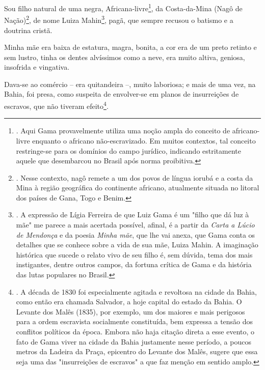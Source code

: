 Sou filho natural de uma negra, Africana-livre\footnote{. Aqui Gama
  provavelmente utiliza uma noção ampla do conceito de africano-livre
  enquanto o africano não-escravizado. Em muitos contextos, tal conceito
  restringe-se para os domínios do campo jurídico, indicando
  estritamente aquele que desembarcou no Brasil após norma proibitiva.},
da Costa-da-Mina (Nagô de Nação)\footnote{. Nesse contexto, nagô remete
  a um dos povos de língua iorubá e a costa da Mina à região geográfica
  do continente africano, atualmente situada no litoral dos países de
  Gana, Togo e Benim.}, de nome Luiza Mahin\footnote{. A expressão de
  Lígia Ferreira de que Luiz Gama é um "filho que dá luz à mãe" me
  parece a mais acertada possível, afinal, é a partir da \emph{Carta a
  Lúcio de Mendonça} e da poesia \emph{Minha mãe}, que lhe vai anexa,
  que Gama conta os detalhes que se conhece sobre a vida de sua mãe,
  Luiza Mahin. A imaginação histórica que sucede o relato vivo de seu
  filho é, sem dúvida, tema dos mais instigantes, dentre outros campos,
  da fortuna crítica de Gama e da história das lutas populares no
  Brasil.}, pagã, que sempre recusou o batismo e a doutrina cristã.

Minha mãe era baixa de estatura, magra, bonita, a cor era de um preto
retinto e sem lustro, tinha os dentes alvíssimos como a neve, era muito
altiva, geniosa, insofrida e vingativa.

Dava-se ao comércio -- era quitandeira --, muito laboriosa; e mais de
uma vez, na Bahia, foi presa, como suspeita de envolver-se em planos de
insurreições de escravos, que não tiveram efeito\footnote{. A década de
  1830 foi especialmente agitada e revoltosa na cidade da Bahia, como
  então era chamada Salvador, a hoje capital do estado da Bahia. O
  Levante dos Malês (1835), por exemplo, um dos maiores e mais perigosos
  para a ordem escravista socialmente constituída, bem expressa a tensão
  dos conflitos políticos da época. Embora não haja citação direta a
  esse evento, o fato de Gama viver na cidade da Bahia justamente nesse
  período, a poucos metros da Ladeira da Praça, epicentro do Levante dos
  Malês, sugere que essa seja uma das "insurreições de escravos" a que
  faz menção em sentido amplo.}.

